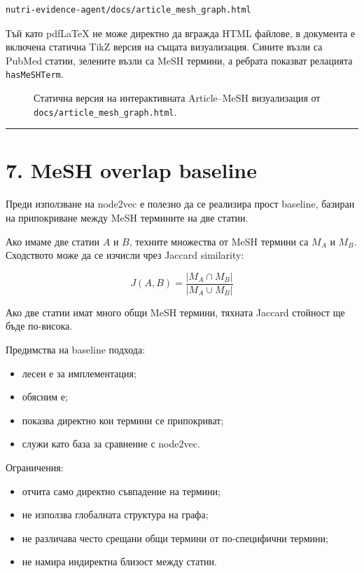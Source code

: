 \documentclass[12pt,a4paper]{article}
\providecommand{\tightlist}{\setlength{\itemsep}{0pt}\setlength{\parskip}{0pt}}
\begin{document}
\begin{verbatim}
nutri-evidence-agent/docs/article_mesh_graph.html
\end{verbatim}

Тъй като pdfLaTeX не може директно да вгражда HTML файлове, в документа е включена статична TikZ версия на същата визуализация. Сините възли са PubMed статии, зелените възли са MeSH термини, а ребрата показват релацията \texttt{hasMeSHTerm}.

\begin{figure}[H]
\centering

\caption{Статична версия на интерактивната Article--MeSH визуализация от \texttt{docs/article\_mesh\_graph.html}.}
\label{fig:article-mesh-graph}
\end{figure}

\vspace{0.5em}\hrule\vspace{1.0em}

\section{7. MeSH overlap baseline}

Преди използване на node2vec е полезно да се реализира прост baseline, базиран на припокриване между MeSH термините на две статии.

Ако имаме две статии $A$ и $B$, техните множества от MeSH термини са $M_A$ и $M_B$. Сходството може да се изчисли чрез Jaccard similarity:

\begin{equation}
J(A, B) = \frac{|M_A \cap M_B|}{|M_A \cup M_B|}
\end{equation}

Ако две статии имат много общи MeSH термини, тяхната Jaccard стойност ще бъде по-висока.

Предимства на baseline подхода:

\begin{itemize}
\tightlist
\item
  лесен е за имплементация;
\item
  обясним е;
\item
  показва директно кои термини се припокриват;
\item
  служи като база за сравнение с node2vec.
\end{itemize}

Ограничения:

\begin{itemize}
\tightlist
\item
  отчита само директно съвпадение на термини;
\item
  не използва глобалната структура на графа;
\item
  не различава често срещани общи термини от по-специфични термини;
\item
  не намира индиректна близост между статии.
\end{itemize}
\end{document}
